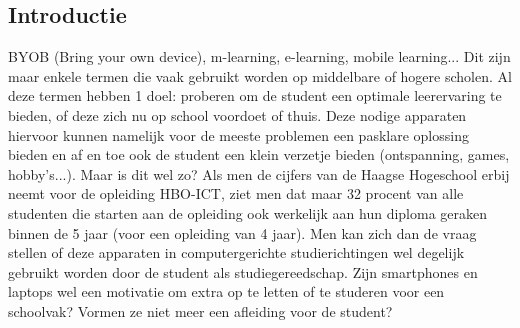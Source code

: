 \documentclass[a0,portrait]{a0poster}
\begin{document}
\begin{multicols}{2}
\section*{Introductie}
\color{black}
\color{black}
BYOB (Bring your own device), m-learning, e-learning, mobile learning... Dit zijn maar enkele termen die vaak gebruikt worden op middelbare of hogere scholen. Al deze termen hebben 1 doel: proberen om de student een optimale leerervaring te bieden, of deze zich nu op school voordoet of thuis. Deze nodige apparaten hiervoor kunnen namelijk voor de
meeste problemen een pasklare oplossing bieden en af en toe ook de student een klein verzetje bieden (ontspanning, games, hobby’s...). Maar is dit wel zo? Als men de cijfers van de Haagse Hogeschool erbij neemt voor de opleiding HBO-ICT, ziet men dat maar 32 procent
van alle studenten die starten aan de opleiding ook werkelijk aan hun diploma geraken binnen de 5 jaar (voor een opleiding van 4 jaar). Men kan zich dan de vraag stellen of deze apparaten in computergerichte studierichtingen wel degelijk gebruikt worden door de student als studiegereedschap. Zijn smartphones en laptops wel een motivatie om extra op te letten
of te studeren voor een schoolvak? Vormen ze niet meer een afleiding voor de student?

\color{Black} %
\color{HoGentAccent1} 

\end{multicols}
\end{document}
